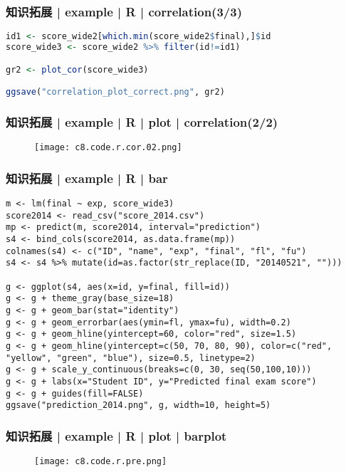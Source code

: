 \begin{frame}[fragile]
  \frametitle{知识拓展 | example | R | correlation(3/3)}
\begin{lstlisting}[language=r]
id1 <- score_wide2[which.min(score_wide2$final),]$id
score_wide3 <- score_wide2 %>% filter(id!=id1)

gr2 <- plot_cor(score_wide3)

ggsave("correlation_plot_correct.png", gr2)
\end{lstlisting}
\end{frame}

\begin{frame}
  \frametitle{知识拓展 | example | R | plot | correlation(2/2)}
  \begin{figure}
    \centering
    \texttt{[image: c8.code.r.cor.02.png]}
  \end{figure}
\end{frame}

\begin{frame}[fragile]
  \frametitle{知识拓展 | example | R | bar}
\begin{lstlisting}[basicstyle=\scriptsize\tt,numberstyle=\tiny]
m <- lm(final ~ exp, score_wide3)
score2014 <- read_csv("score_2014.csv")
mp <- predict(m, score2014, interval="prediction")
s4 <- bind_cols(score2014, as.data.frame(mp))
colnames(s4) <- c("ID", "name", "exp", "final", "fl", "fu")
s4 <- s4 %>% mutate(id=as.factor(str_replace(ID, "20140521", "")))

g <- ggplot(s4, aes(x=id, y=final, fill=id))
g <- g + theme_gray(base_size=18)
g <- g + geom_bar(stat="identity")
g <- g + geom_errorbar(aes(ymin=fl, ymax=fu), width=0.2)
g <- g + geom_hline(yintercept=60, color="red", size=1.5)
g <- g + geom_hline(yintercept=c(50, 70, 80, 90), color=c("red", "yellow", "green", "blue"), size=0.5, linetype=2)
g <- g + scale_y_continuous(breaks=c(0, 30, seq(50,100,10)))
g <- g + labs(x="Student ID", y="Predicted final exam score")
g <- g + guides(fill=FALSE)
ggsave("prediction_2014.png", g, width=10, height=5)
\end{lstlisting}
\end{frame}

\begin{frame}
  \frametitle{知识拓展 | example | R | plot | barplot}
  \begin{figure}
    \centering
    \texttt{[image: c8.code.r.pre.png]}
  \end{figure}
\end{frame}



